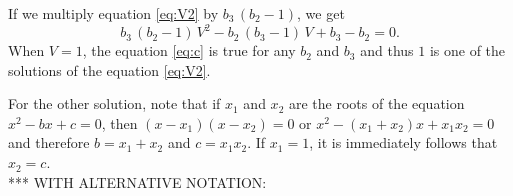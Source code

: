 \documentclass[12pt]{article}
\theoremstyle{remark}
\begin{document}
If we multiply equation \eqref{eq:V2} by $b_3 \, (b_2 - 1)$, we
get 
\begin{equation} \label{eq:c}
  b_3 \, (b_2 - 1) \, V^2 - b_2 \, (b_3 - 1) \, V + b_3 - b_2 = 0.
\end{equation}
When $V = 1$, the equation \eqref{eq:c} is true for any $b_2$ and
$b_3$ and thus $1$ is one of the solutions of the equation
\eqref{eq:V2}.  
\iffalse
\begin{equation}
 \cancel{b_3 \, b_2} - \cancel{b_3} - \cancel{b_2 \, b_3} +
 \bcancel{b_2} + \cancel{b_3} - \bcancel{b_2} = 0. 
\end{equation}
Thus, $1$ is the solution of the equation \eqref{eq:V2}. \\
\fi
For the other solution, note that if $x_1$ and $x_2$ are the roots of the
equation $x^2 - bx + c = 0$, then $(x - x_1)(x - x_2) = 0$ or $x^2 -
(x_1 + x_2)x + x_1 x_2 = 0$ and therefore $b = x_1 + x_2$ and $c = x_1
x_2$. If $x_1 = 1$, it is immediately follows that $x_2 = c$. \\


{\large {\color{blue} *** WITH ALTERNATIVE NOTATION: } } \\
\end{document}
